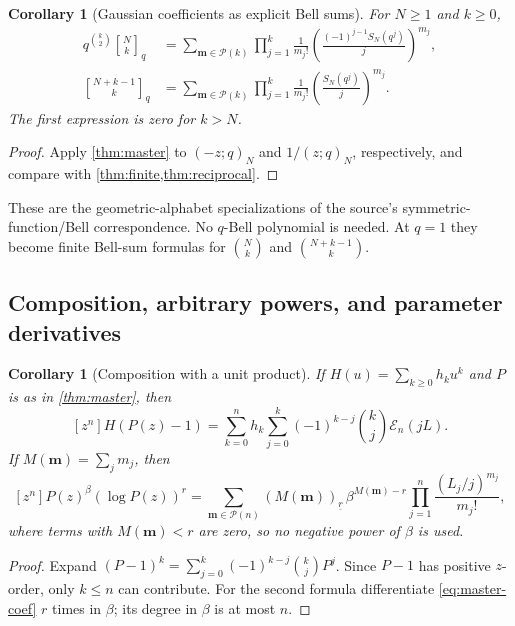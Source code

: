 \documentclass[11pt,a4paper]{article}
\numberwithin{equation}{section}
\newtheorem{corollary}[theorem]{Corollary}
\theoremstyle{definition}
\theoremstyle{remark}
\newcommand{\qb}[2]{\genfrac{[}{]}{0pt}{}{#1}{#2}_{q}}
\newcommand{\poch}[3]{(#1;#2)_{#3}}
\newcommand{\Ecal}{\mathcal E}
\newcommand{\Pcal}{\mathcal P}
\begin{document}
\begin{corollary}[Gaussian coefficients as explicit Bell sums]\label{cor:gauss-bell}
For $N\ge1$ and $k\ge0$,
\begin{align}
 q^{\binom k2}\qb Nk
 &=\sum_{\bm m\in\Pcal(k)}\prod_{j=1}^k
    \frac1{m_j!}\left(\frac{(-1)^{j-1}S_N(q^j)}j\right)^{m_j},
 \label{eq:elementary-Bell}\\
 \qb{N+k-1}k
 &=\sum_{\bm m\in\Pcal(k)}\prod_{j=1}^k
    \frac1{m_j!}\left(\frac{S_N(q^j)}j\right)^{m_j}.
 \label{eq:complete-Bell}
\end{align}
The first expression is zero for $k>N$.
\end{corollary}
\begin{proof}
Apply \cref{thm:master} to $\poch{-z}qN$ and $1/\poch zqN$, respectively,
and compare with \cref{thm:finite,thm:reciprocal}.
\end{proof}
These are the geometric-alphabet specializations of the source's
symmetric-function/Bell correspondence. No $q$-Bell polynomial is needed.
At $q=1$ they become finite Bell-sum formulas for $\binom Nk$ and
$\binom{N+k-1}k$.

\subsection{Composition, arbitrary powers, and parameter derivatives}
\begin{corollary}[Composition with a unit product]\label{cor:compose-P}
If $H(u)=\sum_{k\ge0}h_ku^k$ and $P$ is as in \cref{thm:master}, then
\begin{equation}\label{eq:compose-P}
 [z^n]H(P(z)-1)
 =\sum_{k=0}^n h_k\sum_{j=0}^k(-1)^{k-j}\binom kj\Ecal_n(jL).
\end{equation}
If $M(\bm m)=\sum_jm_j$, then
\begin{equation}\label{eq:beta-derivative}
 [z^n]P(z)^\beta(\log P(z))^r
 =\sum_{\bm m\in\Pcal(n)}
   (M(\bm m))_{\underline r}\,\beta^{M(\bm m)-r}
   \prod_{j=1}^n\frac{(L_j/j)^{m_j}}{m_j!},
\end{equation}
where terms with $M(\bm m)<r$ are zero, so no negative power of $\beta$ is used.
\end{corollary}
\begin{proof}
Expand $(P-1)^k=\sum_{j=0}^k(-1)^{k-j}\binom kjP^j$.
Since $P-1$ has positive $z$-order, only $k\le n$ can contribute.
For the second formula differentiate \eqref{eq:master-coef} $r$ times in $\beta$;
its degree in $\beta$ is at most $n$.
\end{proof}
\end{document}
